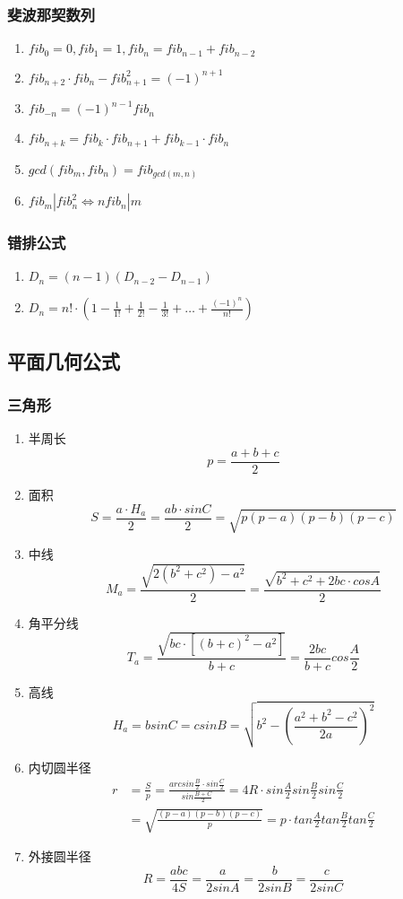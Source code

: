 \documentclass[a4paper]{article}
\begin{document}
\subsubsection{斐波那契数列}

\begin{enumerate}
	\item $fib_0=0, fib_1=1, fib_n=fib_{n-1}+fib_{n-2}$
	\item $fib_{n+2} \cdot fib_n-fib_{n+1}^2=(-1)^{n+1}$
	\item $fib_{-n}=(-1)^{n-1}fib_n$
	\item $fib_{n+k}=fib_k \cdot fib_{n+1}+fib_{k-1} \cdot fib_n$
	\item $gcd(fib_m, fib_n)=fib_{gcd(m, n)}$
	\item $fib_m|fib_n^2\Leftrightarrow nfib_n|m$
\end{enumerate}

\subsubsection{错排公式}

\begin{enumerate}
	\item $D_n = (n-1)(D_{n-2}-D_{n-1})$
	\item $D_n = n! \cdot (1-\frac{1}{1!}+\frac{1}{2!}-\frac{1}{3!}+\ldots+\frac{(-1)^n}{n!})$
\end{enumerate}

\subsection{平面几何公式}

\subsubsection{三角形}

\begin{enumerate}
	\item 半周长
		$$p=\frac{a+b+c}{2}$$
	\item 面积
		$$S=\frac{a \cdot H_a}{2}=\frac{ab \cdot sinC}{2}=\sqrt{p(p-a)(p-b)(p-c)}$$
	\item 中线
		$$M_a=\frac{\sqrt{2(b^2+c^2)-a^2}}{2}=\frac{\sqrt{b^2+c^2+2bc \cdot cosA}}{2}$$
	\item 角平分线 
		$$T_a=\frac{\sqrt{bc \cdot [(b+c)^2-a^2]}}{b+c}=\frac{2bc}{b+c}cos\frac{A}{2}$$
	\item 高线
		$$H_a=bsinC=csinB=\sqrt{b^2-(\frac{a^2+b^2-c^2}{2a})^2}$$
	\item 内切圆半径
		\begin{align*}
			r&=\frac{S}{p}=\frac{arcsin\frac{B}{2} \cdot sin\frac{C}{2}}{sin\frac{B+C}{2}}=4R \cdot sin\frac{A}{2}sin\frac{B}{2}sin\frac{C}{2}\\
			&=\sqrt{\frac{(p-a)(p-b)(p-c)}{p}}=p \cdot tan\frac{A}{2}tan\frac{B}{2}tan\frac{C}{2}
		\end{align*}
	\item 外接圆半径
		$$R=\frac{abc}{4S}=\frac{a}{2sinA}=\frac{b}{2sinB}=\frac{c}{2sinC}$$
\end{enumerate}
\end{document}
